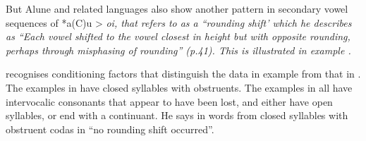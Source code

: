 But Alune
and related languages also show another pattern in secondary
vowel sequences of *a(C)u > \it{oi},
that \citet[41ff]{Collins1983} refers to as a “rounding shift’
which he describes as “Each vowel shifted to the vowel closest
in height but with opposite rounding,
perhaps through misphasing of rounding” (p.41).
This is illustrated in example .
\mbox{}\\


\citet[42]{Collins1983} recognises conditioning factors that
distinguish the data in example  from that in .
The examples in  have closed syllables with obstruents.
The examples in  all have intervocalic consonants that
appear to have been lost,
and either have open syllables,
or end with a continuant.
He says in words from closed syllables with obstruent codas in
 “no rounding shift occurred”.

